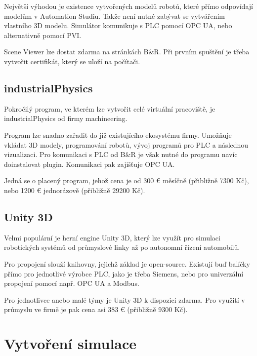        Největší výhodou je existence vytvořených modelů robotů,
        které přímo odpovídají modelům v Automation Studiu. Takže
        není nutné zabývat se vytvářením vlastního 3D modelu. 
        Simulátor komunikuje s PLC pomocí OPC UA, nebo alternativně
        pomocí PVI.

        Scene Viewer lze dostat zdarma na stránkách B\&R. Při prvním
        spuštění je třeba vytvořit certifikát, který se uloží
        na počítači.

    \subsection*{industrialPhysics}
        Pokročilý program, ve kterém lze vytvořit celé virtuální
        pracoviště, je industrialPhysics od firmy machineering.
        
        Program lze snadno zařadit do již existujícího ekosystému firmy.
        Umožňuje vkládat 3D modely, programování robotů, vývoj programů
        pro PLC a následnou vizualizaci.
        Pro komunikaci s PLC od B\&R je však nutné do programu
        navíc doinstalovat plugin. Komunikaci pak zajišťuje OPC UA.

        Jedná se o placený program, jehož cena je od 300 € měsíčně
        (přibližně 7300 Kč), nebo 1200 € jednorázově (přibližně 29200 Kč).

    \subsection*{Unity 3D}
        Velmi populární je herní engine Unity 3D, který lze využít pro 
        simulaci robotických systémů od průmyslové linky až po autonomní 
        řízení automobilů.

        Pro propojení slouží knihovny, jejichž základ je open-source. Existují
        buď balíčky přímo pro jednotlivé výrobce PLC, jako je třeba Siemens, 
        nebo pro univerzální propojení pomocí např. OPC UA a Modbus.

        Pro jednotlivce anebo malé týmy je Unity 3D k dispozici zdarma. Pro využití
        v průmyslu ve firmě je pak cena asi 383 € (přibližně 9300 Kč).
    
    \section{Vytvoření simulace}

